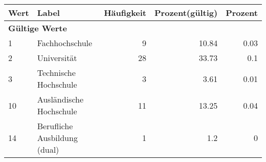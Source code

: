      \begin{longtable}{lXrrr}
     \toprule
     \textbf{Wert} & \textbf{Label} & \textbf{Häufigkeit} & \textbf{Prozent(gültig)} & \textbf{Prozent} \\
     \endhead
     \midrule
     \multicolumn{5}{l}{\textbf{Gültige Werte}}\\

     1 &
     \multicolumn{1}{X}{ Fachhochschule   } &


       \num{9} &
       \num[round-mode=places,round-precision=2]{10,84} &
         \num[round-mode=places,round-precision=2]{0,03} \\

     2 &
     \multicolumn{1}{X}{ Universität   } &


       \num{28} &
       \num[round-mode=places,round-precision=2]{33,73} &
         \num[round-mode=places,round-precision=2]{0,1} \\

     3 &
     \multicolumn{1}{X}{ Technische Hochschule   } &


       \num{3} &
       \num[round-mode=places,round-precision=2]{3,61} &
         \num[round-mode=places,round-precision=2]{0,01} \\

     10 &
     \multicolumn{1}{X}{ Ausländische Hochschule   } &


       \num{11} &
       \num[round-mode=places,round-precision=2]{13,25} &
         \num[round-mode=places,round-precision=2]{0,04} \\

     14 &
     \multicolumn{1}{X}{ Berufliche Ausbildung (dual)   } &


       \num{1} &
       \num[round-mode=places,round-precision=2]{1,2} &
         \num[round-mode=places,round-precision=2]{0} \\


\end{longtable}

